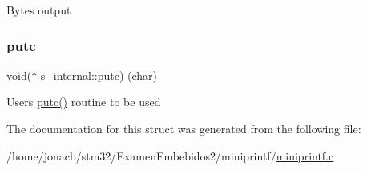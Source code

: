 Bytes output \mbox{\label{structs__internal_a046caf8bd89d8e15e72d1343200347ec}} 
\subsubsection{\texorpdfstring{putc}{putc}}
{\footnotesize\ttfamily void($\ast$ s\+\_\+internal\+::putc) (char)}

User\textquotesingle{}s \hyperlink{structs__internal_a046caf8bd89d8e15e72d1343200347ec}{putc()} routine to be used 

The documentation for this struct was generated from the following file\+:\begin{DoxyCompactItemize}
\item 
/home/jonacb/stm32/\+Examen\+Embebidos2/miniprintf/\hyperlink{miniprintf_8c}{miniprintf.\+c}\end{DoxyCompactItemize}
